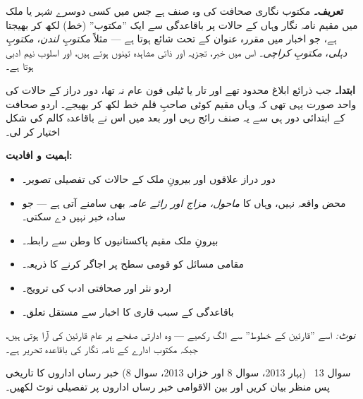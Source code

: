 \begin{hal}
\textbf{تعریف۔} مکتوب نگاری صحافت کی وہ صنف ہے جس میں کسی دوسرے شہر یا ملک میں
مقیم نامہ نگار وہاں کے حالات پر باقاعدگی سے ایک ''مکتوب'' (خط) لکھ کر بھیجتا
ہے، جو اخبار میں مقررہ عنوان کے تحت شائع ہوتا ہے --- مثلاً \emph{مکتوبِ لندن}،
\emph{مکتوبِ دہلی}، \emph{مکتوبِ کراچی}۔ اس میں خبر، تجزیہ اور ذاتی مشاہدہ تینوں
ہوتے ہیں، اور اسلوب نیم ادبی ہوتا ہے۔

\medskip
\textbf{ابتدا۔} جب ذرائع ابلاغ محدود تھے اور تار یا ٹیلی فون عام نہ تھا، دور
دراز کے حالات کی واحد صورت یہی تھی کہ وہاں مقیم کوئی صاحبِ قلم خط لکھ کر
بھیجے۔ اردو صحافت کے ابتدائی دور ہی سے یہ صنف رائج رہی اور بعد میں اس نے
باقاعدہ کالم کی شکل اختیار کر لی۔

\medskip
\textbf{اہمیت و افادیت:}
\begin{itemize}\setlength{\itemsep}{1pt}
  \item دور دراز علاقوں اور بیرونِ ملک کے حالات کی تفصیلی تصویر۔
  \item محض واقعہ نہیں، وہاں کا \emph{ماحول، مزاج اور رائے عامہ} بھی سامنے آتی
        ہے --- جو سادہ خبر نہیں دے سکتی۔
  \item بیرونِ ملک مقیم پاکستانیوں کا وطن سے رابطہ۔
  \item مقامی مسائل کو قومی سطح پر اجاگر کرنے کا ذریعہ۔
  \item اردو نثر اور صحافتی ادب کی ترویج۔
  \item باقاعدگی کے سبب قاری کا اخبار سے مستقل تعلق۔
\end{itemize}

\smallskip
\emph{نوٹ:} اسے ''قارئین کے خطوط'' سے الگ رکھیے --- وہ ادارتی صفحے پر عام
قارئین کی آرا ہوتی ہیں، جبکہ مکتوب ادارے کے نامہ نگار کی باقاعدہ تحریر ہے۔

\end{hal}

\begin{sawal}{سوال \textenglish{13} \ \textnormal{\small(بہار \textenglish{2013}، سوال \textenglish{8} اور خزاں \textenglish{2013}، سوال \textenglish{8})}}
خبر رساں اداروں کا تاریخی پس منظر بیان کریں اور بین الاقوامی خبر رساں اداروں پر
تفصیلی نوٹ لکھیں۔
\end{sawal}


